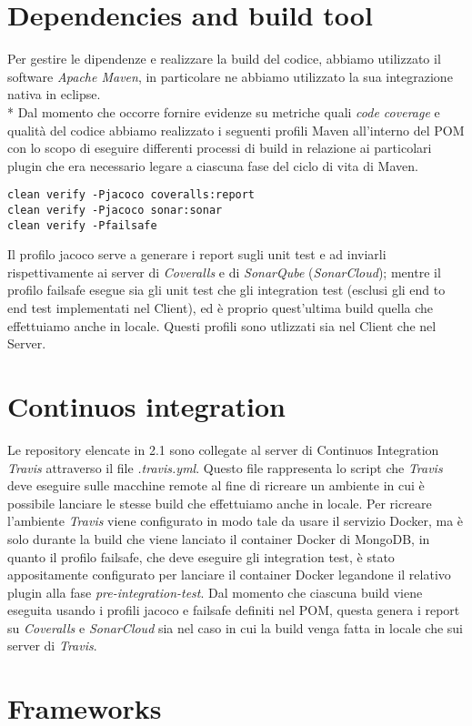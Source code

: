 \section{Dependencies and build tool}
Per gestire le dipendenze e realizzare la build del codice, abbiamo utilizzato il software \emph{Apache Maven}, in particolare ne abbiamo utilizzato la sua integrazione nativa in eclipse.\\*
Dal momento che occorre fornire evidenze su metriche quali \emph{code coverage} e qualit\`a del codice abbiamo realizzato i seguenti profili Maven all'interno del POM con lo scopo di eseguire differenti processi di build in relazione ai particolari plugin che era necessario legare a ciascuna fase del ciclo di vita di Maven.
\begin{lstlisting}
clean verify -Pjacoco coveralls:report
clean verify -Pjacoco sonar:sonar
clean verify -Pfailsafe
\end{lstlisting}
Il profilo jacoco serve a generare i report sugli unit test e ad inviarli rispettivamente ai server di \emph{Coveralls} e di \emph{SonarQube} (\emph{SonarCloud}); mentre il profilo failsafe esegue sia gli unit test che gli integration test (esclusi gli end to end test implementati nel Client), ed \`e proprio quest'ultima build quella che effettuiamo anche in locale. Questi profili sono utlizzati sia nel Client che nel Server.
\section{Continuos integration}
Le repository elencate in 2.1 sono collegate al server di Continuos Integration \emph{Travis} attraverso il file \emph{.travis.yml}. Questo file rappresenta lo script che \emph{Travis} deve eseguire sulle macchine remote al fine di ricreare un ambiente in cui \`e possibile lanciare le stesse build che effettuiamo anche in locale. Per ricreare l'ambiente \emph{Travis} viene configurato in modo tale da usare il servizio Docker, ma \`e solo durante la build che viene lanciato il container Docker di MongoDB, in quanto il profilo failsafe, che deve eseguire gli integration test, \`e stato appositamente configurato per lanciare il container Docker legandone il relativo plugin alla fase \emph{pre-integration-test}. Dal momento che ciascuna build viene eseguita usando i profili jacoco e failsafe definiti nel POM, questa genera i report su \emph{Coveralls} e \emph{SonarCloud} sia nel caso in cui la build venga fatta in locale che sui server di \emph{Travis}. 
\section{Frameworks}

